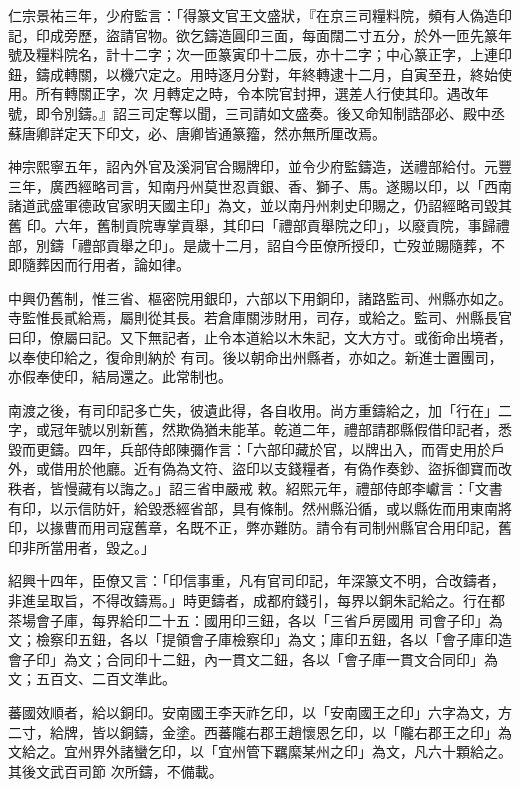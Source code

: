 \begin{pinyinscope}
 仁宗景祐三年，少府監言：「得篆文官王文盛狀，『在京三司糧料院，頻有人偽造印記，印成旁歷，盜請官物。欲乞鑄造圓印三面，每面闊二寸五分，於外一匝先篆年號及糧料院名，計十二字；次一匝篆寅印十二辰，亦十二字；中心篆正字，上連印鈕，鑄成轉關，以機穴定之。用時逐月分對，年終轉逮十二月，自寅至丑，終始使用。所有轉關正字，次
 月轉定之時，令本院官封押，選差人行使其印。遇改年號，即令別鑄。』詔三司定奪以聞，三司請如文盛奏。後又命知制誥邵必、殿中丞蘇唐卿詳定天下印文，必、唐卿皆通篆籀，然亦無所厘改焉。



 神宗熙寧五年，詔內外官及溪洞官合賜牌印，並令少府監鑄造，送禮部給付。元豐三年，廣西經略司言，知南丹州莫世忍貢銀、香、獅子、馬。遂賜以印，以「西南諸道武盛軍德政官家明天國主印」為文，並以南丹州刺史印賜之，仍詔經略司毀其舊
 印。六年，舊制貢院專掌貢舉，其印曰「禮部貢舉院之印」，以廢貢院，事歸禮部，別鑄「禮部貢舉之印」。是歲十二月，詔自今臣僚所授印，亡歿並賜隨葬，不即隨葬因而行用者，論如律。



 中興仍舊制，惟三省、樞密院用銀印，六部以下用銅印，諸路監司、州縣亦如之。寺監惟長貳給焉，屬則從其長。若倉庫關涉財用，司存，或給之。監司、州縣長官曰印，僚屬曰記。又下無記者，止令本道給以木朱記，文大方寸。或銜命出境者，以奉使印給之，復命則納於
 有司。後以朝命出州縣者，亦如之。新進士置團司，亦假奉使印，結局還之。此常制也。



 南渡之後，有司印記多亡失，彼遺此得，各自收用。尚方重鑄給之，加「行在」二字，或冠年號以別新舊，然欺偽猶未能革。乾道二年，禮部請郡縣假借印記者，悉毀而更鑄。四年，兵部侍郎陳彌作言：「六部印藏於官，以牌出入，而胥史用於戶外，或借用於他廳。近有偽為文符、盜印以支錢糧者，有偽作奏鈔、盜拆御寶而改秩者，皆慢藏有以誨之。」詔三省申嚴戒
 敕。紹熙元年，禮部侍郎李巘言：「文書有印，以示信防奸，給毀悉經省部，具有條制。然州縣沿循，或以縣佐而用東南將印，以掾曹而用司寇舊章，名既不正，弊亦難防。請令有司制州縣官合用印記，舊印非所當用者，毀之。」



 紹興十四年，臣僚又言：「印信事重，凡有官司印記，年深篆文不明，合改鑄者，非進呈取旨，不得改鑄焉。」時更鑄者，成都府錢引，每界以銅朱記給之。行在都茶場會子庫，每界給印二十五：國用印三鈕，各以「三省戶房國用
 司會子印」為文；檢察印五鈕，各以「提領會子庫檢察印」為文；庫印五鈕，各以「會子庫印造會子印」為文；合同印十二鈕，內一貫文二鈕，各以「會子庫一貫文合同印」為文；五百文、二百文準此。



 蕃國效順者，給以銅印。安南國王李天祚乞印，以「安南國王之印」六字為文，方二寸，給牌，皆以銅鑄，金塗。西蕃隴右郡王趙懷恩乞印，以「隴右郡王之印」為文給之。宜州界外諸蠻乞印，以「宜州管下羈縻某州之印」為文，凡六十顆給之。其後文武百司節
 次所鑄，不備載。




\end{pinyinscope}
